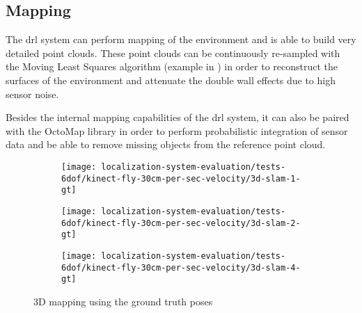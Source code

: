 \subsection{Mapping}

The \gls{drl} system can perform mapping of the environment and is able to build very detailed point clouds. These point clouds can be continuously re-sampled with the Moving Least Squares algorithm (example in ) in order to reconstruct the surfaces of the environment and attenuate the double wall effects due to high sensor noise.

Besides the internal mapping capabilities of the \gls{drl} system, it can also be paired with the OctoMap \cite{Hornung2013} library in order to perform probabilistic integration of sensor data and be able to remove missing objects from the reference point cloud.


\begin{figure}[H]
	\centering
	\begin{subfigure}[ht]{0.4\textwidth}
		\centering
		\texttt{[image: localization-system-evaluation/tests-6dof/kinect-fly-30cm-per-sec-velocity/3d-slam-1-gt]}
	\end{subfigure}
	\begin{subfigure}[ht]{0.4\textwidth}
		\centering
		\texttt{[image: localization-system-evaluation/tests-6dof/kinect-fly-30cm-per-sec-velocity/3d-slam-2-gt]}
	\end{subfigure}
	\begin{subfigure}[ht]{0.4\textwidth}
		\centering
		\texttt{[image: localization-system-evaluation/tests-6dof/kinect-fly-30cm-per-sec-velocity/3d-slam-4-gt]}
	\end{subfigure}
	\caption{3D mapping using the ground truth poses}
	\label{fig:localization-system-evaluation_kinect-fly-30cm-per-sec-velocity-gt-slam}
\end{figure}


